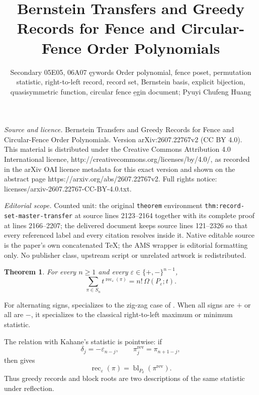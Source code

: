 \documentclass[10pt,a4paper]{amsart}
\newtheorem{theorem}{Theorem}[section]
\DeclareMathOperator{\rec}{rec}
\newcommand{\eps}{\varepsilon}
\begin{document}
\title[Bernstein Transfers and Greedy Records for Fence and Circula]{Bernstein Transfers and Greedy Records for Fence and Circular-Fence Order Polynomials}
\author{Secondary 05E05, 06A07 ęywords Order polynomial, fence poset, permutation statistic, right-to-left record, record set, Bernstein basis, explicit bijection, quasisymmetric function, circular fence e̱gin document; Pyuyi Chufeng Huang}
\date{}
\maketitle
\noindent\emph{Source and licence.} Bernstein Transfers and Greedy Records for Fence and Circular-Fence Order Polynomials. Version arXiv:2607.22767v2 (CC BY 4.0). This material is distributed under the Creative Commons Attribution 4.0 International licence, http://creativecommons.org/licenses/by/4.0/, as recorded in the arXiv OAI licence metadata for this exact version and shown on the abstract page https://arxiv.org/abs/2607.22767v2. Full rights notice: licenses/arxiv-2607.22767-CC-BY-4.0.txt.\par\smallskip
\noindent\textit{Editorial scope.} Counted unit: the original \texttt{theorem} environment \texttt{thm:record-set-master-transfer} at source lines 2123--2164 together with its complete proof at lines 2166--2207; the delivered document keeps source lines 121--2326 so that every referenced label and every citation resolves inside it. Native editable source is the paper's own concatenated TeX; the AMS wrapper is editorial formatting only. No publisher class, upstream script or unrelated artwork is redistributed.
\begin{theorem}\label{thm:main-general}
For every \(n\ge1\) and every \(\eps\in\{+,-\}^{n-1}\),
\[
\sum_{\pi\in S_n} t^{\rec_\eps(\pi)}
=
n!\,\Omega(P_\eps;t).
\]
\end{theorem}

For alternating signs,  specializes to the zig-zag case
of \cite[Problem~5.3]{FMP}.  When all signs are \(+\) or all are \(-\), it
specializes to the classical right-to-left maximum or minimum statistic.

The relation with Kahane's statistic is pointwise: if
\[
\delta_j=-\eps_{n-j},
\qquad
\pi^{\mathrm{rev}}_j=\pi_{n+1-j},
\]
then  gives
\[
\rec_\eps(\pi)
=\operatorname{bl}_{P_\delta}(\pi^{\mathrm{rev}}).
\]
Thus greedy records and block roots are two descriptions of the same
statistic under reflection.
\end{document}
